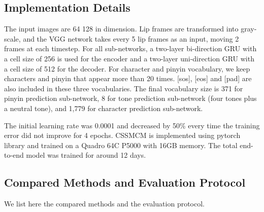 \documentclass[sigconf]{acmart}
\begin{document}
\subsection{Implementation Details}
The input images are 64  128 in dimension. Lip frames are transformed into gray-scale, and the VGG network takes every 5 lip frames as an input, moving 2 frames at each timestep. For all sub-networks, a two-layer bi-direction GRU \cite{cho2014learning} with a cell size of 256 is used for the encoder and a two-layer uni-direction GRU with a cell size of 512 for the decoder. For character and pinyin vocabulary, we keep characters and pinyin that appear more than 20 times. [sos], [eos] and [pad] are also included in these three vocabularies.  The final vocabulary size is 371 for pinyin prediction sub-network, 8 for tone prediction sub-network (four tones plus a neutral tone), and 1,779 for character prediction sub-network.

The initial learning rate was 0.0001 and decreased by 50\% every time the training error did not improve for 4 epochs. CSSMCM is implemented using pytorch library and trained on a Quadro 64C P5000 with 16GB memory. The total end-to-end model was trained for around 12 days.

\subsection{Compared Methods and Evaluation Protocol}
We list here the compared methods and the evaluation protocol.
\end{document}
